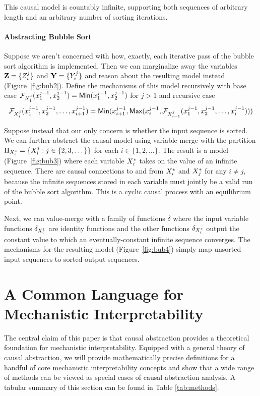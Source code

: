 \documentclass[twoside,11pt]{article}
\begin{document}
This causal model is countably infinite, supporting both sequences of arbitrary length and an arbitrary number of sorting iterations. 

\paragraph{Abstracting Bubble Sort}
Suppose we aren't concerned with how, exactly, each iterative pass of the bubble sort algorithm is implemented. Then we can marginalize away the variables $\mathbf{Z} = \{Z_i^j\}$ and $\mathbf{Y} = \{Y_i^j\}$ and reason about the resulting model instead (Figure~\ref{fig:bub2}). Define the mechanisms of this model recursively with base case $\mathcal{F}_{X_1^j}(x_1^{j-1}, x_2^{j-1}) =\mathsf{Min}(x_1^{j-1}, x_2^{j-1} ) $ for $j>1$ and recursive case
\[\mathcal{F}_{X_i^j}(x^{j-1}_{1}, x^{j-1}_{2},\dots, x^{j-1}_{i+1}) = \mathsf{Min}(x^{j-1}_{i+1}, \mathsf{Max}(x^{j-1}_{i}, \mathcal{F}_{X_{i-1}^j}(x^{j-1}_{1}, x^{j-1}_{2},\dots, x^{j-1}_{i})))\] 

Suppose instead that our only concern is whether the input sequence is sorted. We can further abstract the causal model using variable merge with the partition $\Pi_{X^*_i} = \{X^j_i: j \in \{2,3,\dots\}\}$ for each $i \in \{1, 2, \dots\}$. The result is a model (Figure~\ref{fig:bub3}) where each variable $X^*_i$ takes on the value of an infinite sequence. There are causal connections to and from $X^*_i$ and $X^*_j$ for any $i \not = j$, because the infinite sequences stored in each variable must jointly be a valid run of the bubble sort algorithm. This is a cyclic causal process with an equilibrium point.

Next, we can value-merge with a family of functions $\delta$ where the input variable functions $\delta_{X^1_i}$ are identity functions and the other functions $\delta_{X^*_i}$ output the constant value to which an eventually-constant infinite sequence converges. The mechanisms for the resulting model (Figure~\ref{fig:bub4}) simply map unsorted input sequences to sorted output sequences. 
\newpage



\section{ A Common Language for Mechanistic Interpretability}\label{sec:commonlanguage}
The central claim of this paper is that causal abstraction provides a theoretical foundation for mechanistic interpretability. Equipped with a general theory of causal abstraction, we will provide mathematically precise definitions for a handful of core mechanistic interpretability concepts and show that a wide range of methods can be viewed as special cases of causal abstraction analysis. A tabular summary of this section can be found in Table \ref{tab:methods}.
\end{document}
